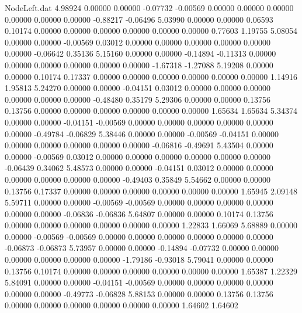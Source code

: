 \begin{filecontents}{NodeLeft.dat}
   4.98924    0.00000    0.00000    -0.07732   -0.00569    0.00000    0.00000    0.00000    0.00000    0.00000    0.00000   -0.88217   -0.06496
   5.03990    0.00000    0.00000     0.06593    0.10174    0.00000    0.00000    0.00000    0.00000    0.00000    0.00000    0.77603    1.19755
   5.08054    0.00000    0.00000    -0.00569    0.03012    0.00000    0.00000    0.00000    0.00000    0.00000    0.00000   -0.06642    0.35136
   5.15160    0.00000    0.00000    -0.14894   -0.11313    0.00000    0.00000    0.00000    0.00000    0.00000    0.00000   -1.67318   -1.27088
   5.19208    0.00000    0.00000     0.10174    0.17337    0.00000    0.00000    0.00000    0.00000    0.00000    0.00000    1.14916    1.95813
   5.24270    0.00000    0.00000    -0.04151    0.03012    0.00000    0.00000    0.00000    0.00000    0.00000    0.00000   -0.48480    0.35179
   5.29306    0.00000    0.00000     0.13756    0.13756    0.00000    0.00000    0.00000    0.00000    0.00000    0.00000    1.65634    1.65634
   5.34374    0.00000    0.00000    -0.04151   -0.00569    0.00000    0.00000    0.00000    0.00000    0.00000    0.00000   -0.49784   -0.06829
   5.38446    0.00000    0.00000    -0.00569   -0.04151    0.00000    0.00000    0.00000    0.00000    0.00000    0.00000   -0.06816   -0.49691
   5.43504    0.00000    0.00000    -0.00569    0.03012    0.00000    0.00000    0.00000    0.00000    0.00000    0.00000   -0.06439    0.34062
   5.48573    0.00000    0.00000    -0.04151    0.03012    0.00000    0.00000    0.00000    0.00000    0.00000    0.00000   -0.49403    0.35849
   5.54662    0.00000    0.00000     0.13756    0.17337    0.00000    0.00000    0.00000    0.00000    0.00000    0.00000    1.65945    2.09148
   5.59711    0.00000    0.00000    -0.00569   -0.00569    0.00000    0.00000    0.00000    0.00000    0.00000    0.00000   -0.06836   -0.06836
   5.64807    0.00000    0.00000     0.10174    0.13756    0.00000    0.00000    0.00000    0.00000    0.00000    0.00000    1.22833    1.66069
   5.68889    0.00000    0.00000    -0.00569   -0.00569    0.00000    0.00000    0.00000    0.00000    0.00000    0.00000   -0.06873   -0.06873
   5.73957    0.00000    0.00000    -0.14894   -0.07732    0.00000    0.00000    0.00000    0.00000    0.00000    0.00000   -1.79186   -0.93018
   5.79041    0.00000    0.00000     0.13756    0.10174    0.00000    0.00000    0.00000    0.00000    0.00000    0.00000    1.65387    1.22329
   5.84091    0.00000    0.00000    -0.04151   -0.00569    0.00000    0.00000    0.00000    0.00000    0.00000    0.00000   -0.49773   -0.06828
   5.88153    0.00000    0.00000     0.13756    0.13756    0.00000    0.00000    0.00000    0.00000    0.00000    0.00000    1.64602    1.64602

\end{filecontents}
